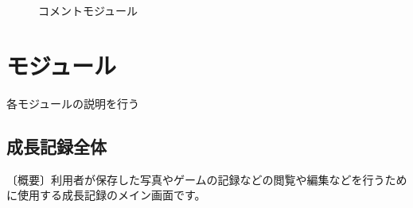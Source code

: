 \documentclass[a4j]{jarticle}
\begin{document}
\begin{figure}[H]
\begin{center}
\caption{コメントモジュール}
\label{comentmoju}
\end{center}
\end{figure}

\section{モジュール}
各モジュールの説明を行う

\subsection{成長記録全体}
〔概要〕利用者が保存した写真やゲームの記録などの閲覧や編集などを行うために使用する成長記録のメイン画面です。
\end{document}
